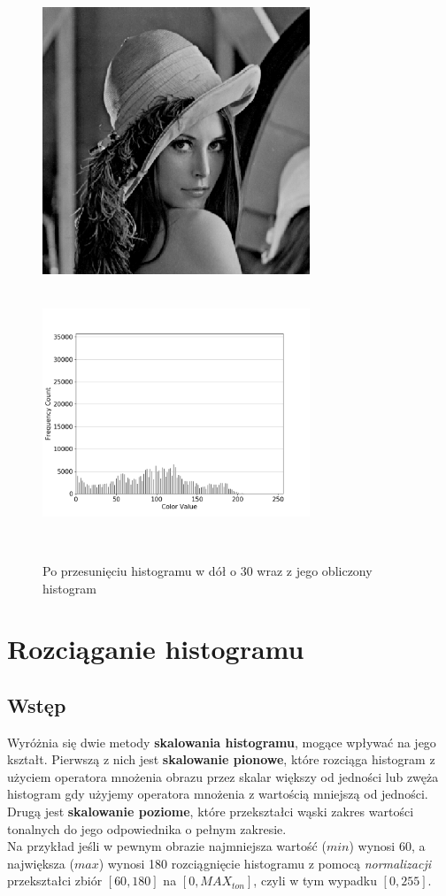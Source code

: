 \documentclass[a4paper,12pt]{book}
\begin{document}
\begin{figure}[H]
	\caption{Po przesunięciu histogramu w dół o 30 wraz z jego obliczony histogram}
	\includegraphics[width=8cm, height=8cm]{5-2/move-histogram-image-lena--30.png}
	\includegraphics[width=8cm, height=8cm]{5-2/move-histogram-lena--30.png}
\end{figure}

\section{Rozciąganie histogramu}
\subsection*{Wstęp}
Wyróżnia się dwie metody \textbf{skalowania histogramu}, mogące wpływać na jego kształt. Pierwszą z nich jest \textbf{skalowanie pionowe}, które rozciąga histogram z użyciem operatora mnożenia obrazu przez skalar większy od jedności lub zwęża histogram gdy użyjemy operatora mnożenia z wartością mniejszą od jedności. Drugą jest \textbf{skalowanie poziome}, które przekształci wąski zakres wartości tonalnych do jego odpowiednika o pełnym zakresie. \\
Na przykład jeśli w pewnym obrazie najmniejsza wartość ($min$) wynosi 60, a największa ($max$) wynosi 180 rozciągnięcie histogramu z pomocą \textit{normalizacji} przekształci zbiór $[60,180]$ na $[0,MAX_{ton}]$, czyli w tym wypadku $[0,255]$. 
\end{document}
